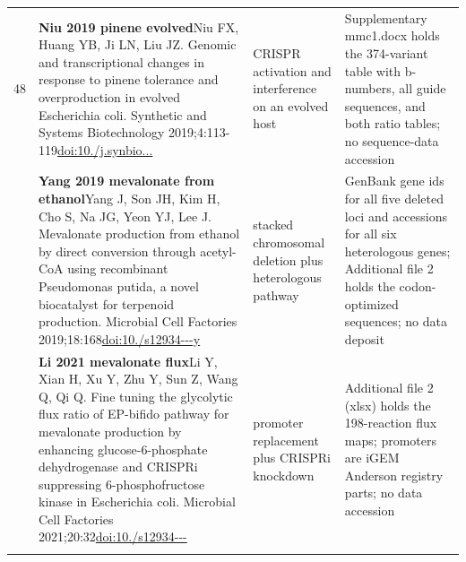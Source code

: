 \begin{landscape}
\begin{longtable}{@{}r@{\hspace{4pt}} L{86mm} L{74mm} L{78mm}@{}}
48 & \textbf{Niu 2019 pinene evolved}\newline Niu FX, Huang YB, Ji LN, Liu JZ. Genomic and transcriptional changes in response to pinene tolerance and overproduction in evolved Escherichia coli. Synthetic and Systems Biotechnology 2019;4:113-119\newline \href{https://doi.org/10.1016/j.synbio.2019.05.001}{doi:10./\allowbreak j.\allowbreak synbio...} & CRISPR activation and interference on an evolved host & Supplementary mmc1.\allowbreak docx holds the 374-\allowbreak variant table with b-\allowbreak numbers, all guide sequences, and both ratio tables; no sequence-\allowbreak data accession \\
 & \textbf{Yang 2019 mevalonate from ethanol}\newline Yang J, Son JH, Kim H, Cho S, Na JG, Yeon YJ, Lee J. Mevalonate production from ethanol by direct conversion through acetyl-CoA using recombinant Pseudomonas putida, a novel biocatalyst for terpenoid production. Microbial Cell Factories 2019;18:168\newline \href{https://doi.org/10.1186/s12934-019-1213-y}{doi:10./\allowbreak s12934---\allowbreak y} & stacked chromosomal deletion plus heterologous pathway & GenBank gene ids for all five deleted loci and accessions for all six heterologous genes; Additional file 2 holds the codon-\allowbreak optimized sequences; no data deposit \\
 & \textbf{Li 2021 mevalonate flux}\newline Li Y, Xian H, Xu Y, Zhu Y, Sun Z, Wang Q, Qi Q. Fine tuning the glycolytic flux ratio of EP-bifido pathway for mevalonate production by enhancing glucose-6-phosphate dehydrogenase and CRISPRi suppressing 6-phosphofructose kinase in Escherichia coli. Microbial Cell Factories 2021;20:32\newline \href{https://doi.org/10.1186/s12934-021-01526-1}{doi:10./\allowbreak s12934---} & promoter replacement plus CRISPRi knockdown & Additional file 2 (xlsx) holds the 198-\allowbreak reaction flux maps; promoters are iGEM Anderson registry parts; no data accession \\
\addlinespace[5pt]
\end{longtable}
\endgroup
\end{landscape}
